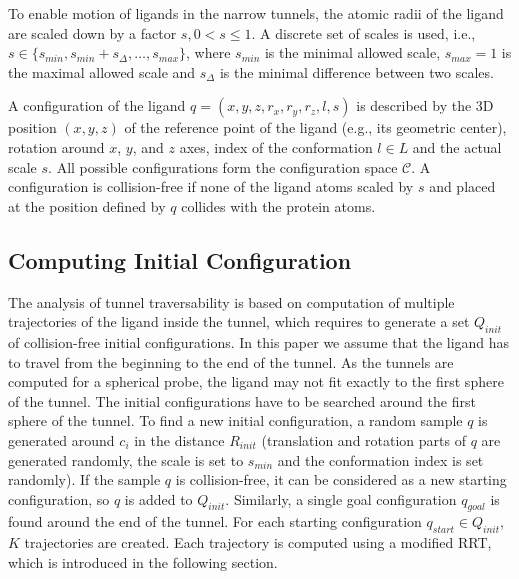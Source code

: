 \documentclass[letterpaper, 10 pt, conference]{ieeeconf} %
\def\qstart{q_{start}}
\def\qinit{\qstart}
\def\qgoal{q_{goal}}
\def\C{\mathcal{C}}
\def\CFD{{\mathcal{C}^s_{free}}}
\def\QI{Q_{init}}
\def\RI{R_{init}}
\def\smin{s_{min}}
\def\smax{s_{max}}
\def\sdelta{s_{\Delta}}
\def\L{L}
\begin{document}
To enable motion of ligands in the narrow tunnels, the atomic radii of the ligand are scaled down by a factor $s, 0 < s \le 1$.
A discrete set of scales is used, i.e., $s \in \{\smin, \smin+\sdelta, \ldots, \smax\}$, where 
$\smin$ is the minimal allowed scale, $\smax=1$ is the maximal allowed scale and $\sdelta$ is the minimal difference between two scales.

A configuration of the ligand $q=(x,y,z,r_x,r_y,r_z,l,s)$  is described
by the 3D position $(x,y,z)$ of the reference point of the ligand (e.g., its geometric center), rotation around $x$, $y$, and $z$ axes,
index of the conformation $l\in \L$ and the actual scale $s$.
All possible configurations form the configuration space $\C$. 
A configuration is collision-free if none of the ligand atoms scaled by $s$ and placed at the
position defined by $q$ collides with the protein atoms.


\subsection{Computing Initial Configuration}

The analysis of tunnel traversability is based on computation of multiple trajectories of the ligand inside the tunnel, which
requires to generate a set $\QI$ of collision-free initial configurations.
In this paper we assume that the ligand has to travel from the beginning to the end of the tunnel.
As the tunnels are computed for a spherical probe, the ligand may not fit exactly to the first sphere of the tunnel.
The initial configurations have to be searched around the first sphere of the tunnel.
To find a new initial configuration, a random sample $q$ is generated around $c_i$ in the distance $\RI$ (translation and rotation
 parts of $q$ are generated randomly, the scale is set to $\smin$ and the conformation index is set randomly).
If the sample $q$ is collision-free, it can be considered as a new starting configuration, so $q$ is added to $\QI$.
Similarly, a single goal configuration $\qgoal$ is found around the end of the tunnel. 
For each starting configuration $\qinit \in \QI$,  $K$ trajectories are created.
Each trajectory is computed using a modified RRT, which is introduced in the following section.
\end{document}
